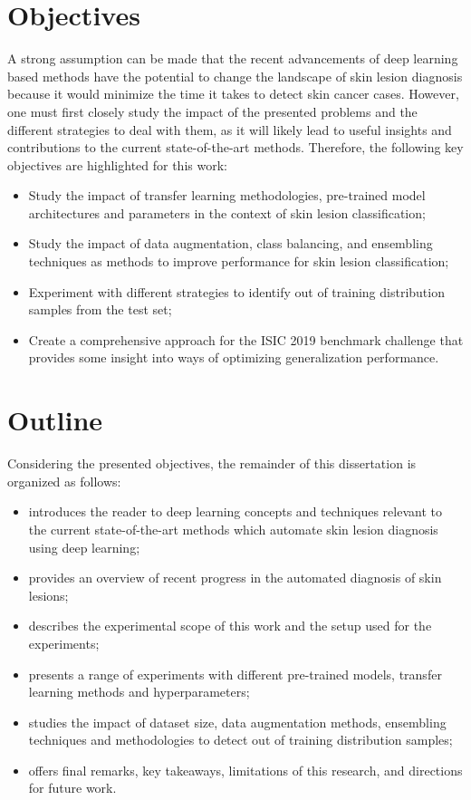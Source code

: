 \section{Objectives}
    A strong assumption can be made that the recent advancements of deep learning based methods have the potential to change the landscape of skin lesion diagnosis because it would minimize the time it takes to detect skin cancer cases. However, one must first closely study the impact of the presented problems and the different strategies to deal with them, as it will likely lead to useful insights and contributions to the current state-of-the-art methods. Therefore, the following key objectives are highlighted for this work:
    \begin{itemize}
        \item Study the impact of transfer learning methodologies, pre-trained model architectures and parameters in the context of skin lesion classification;
        \item Study the impact of data augmentation, class balancing, and ensembling techniques as methods to improve performance for skin lesion classification;
        \item Experiment with different strategies to identify out of training distribution samples from the test set;
        \item Create a comprehensive approach for the \ac{ISIC} 2019 benchmark challenge that provides some insight into ways of optimizing generalization performance.
    \end{itemize}

\section{Outline}
    Considering the presented objectives, the remainder of this dissertation is organized as follows:
    \begin{itemize}
        \item {} introduces the reader to deep learning concepts and techniques relevant to the current state-of-the-art methods which automate skin lesion diagnosis using deep learning;
        \item {} provides an overview of recent progress in the automated diagnosis of skin lesions;
        \item {} describes the experimental scope of this work and the setup used for the experiments; 
        \item {} presents a range of experiments with different pre-trained models, transfer learning methods and hyperparameters; 
        \item {} studies the impact of dataset size, data augmentation methods, ensembling techniques and methodologies to detect out of training distribution samples;
        \item {} offers final remarks, key takeaways, limitations of this research, and directions for future work.
    \end{itemize}